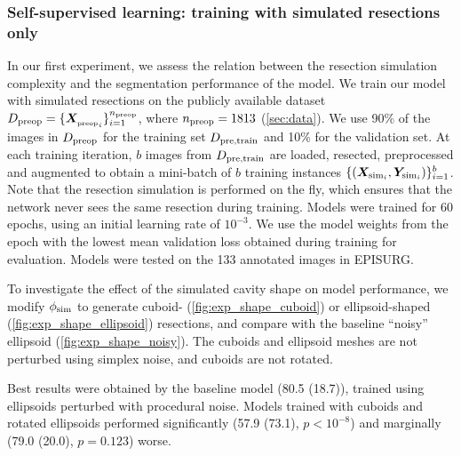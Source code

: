 \subsubsection{Self-supervised learning: training with simulated resections only}
\label{sec:self}

In our first experiment, we assess the relation between the resection simulation complexity and the segmentation performance of the model.
We train our model with simulated resections on the publicly available dataset $D_{\text{preop}} = \{ \bm{X}_{{_{\text{preop}}}_i} \}_{i = 1}^{n_{\text{preop}}}$, where $n_{\text{preop}} = 1813$ (\cref{sec:data}).
We use 90\% of the images in $D_{\text{preop}}$ for the training set $D_{\text{pre,train}}$ and 10\% for the validation set.
At each training iteration, $b$ images from $D_{\text{pre,train}}$ are loaded, resected, preprocessed and augmented to obtain a mini-batch of $b$ training instances
$\{ ( \bm{X}_{\text{sim}_i}, \bm{Y}_{\text{sim}_i}) \}_{i = 1}^{b}$.
Note that the resection simulation is performed on the fly, which ensures that the network never sees the same resection during training.
Models were trained for 60 epochs, using an initial learning rate of $10^{-3}$.
We use the model weights from the epoch with the lowest mean validation loss obtained during training for evaluation.
Models were tested on the 133 annotated images in EPISURG.

To investigate the effect of the simulated cavity shape on model performance, we modify $\phi_{\text{sim}}$ to generate cuboid- (\cref{fig:exp_shape_cuboid}) or ellipsoid-shaped (\cref{fig:exp_shape_ellipsoid}) resections, and compare with the baseline ``noisy'' ellipsoid (\cref{fig:exp_shape_noisy}).
The cuboids and ellipsoid meshes are not perturbed using simplex noise, and cuboids are not rotated.

Best results were obtained by the baseline model (80.5 (18.7)), trained using ellipsoids perturbed with procedural noise.
Models trained with cuboids and rotated ellipsoids performed significantly (57.9 (73.1), $p < 10^{-8}$) and marginally (79.0 (20.0), $p = 0.123$) worse.

